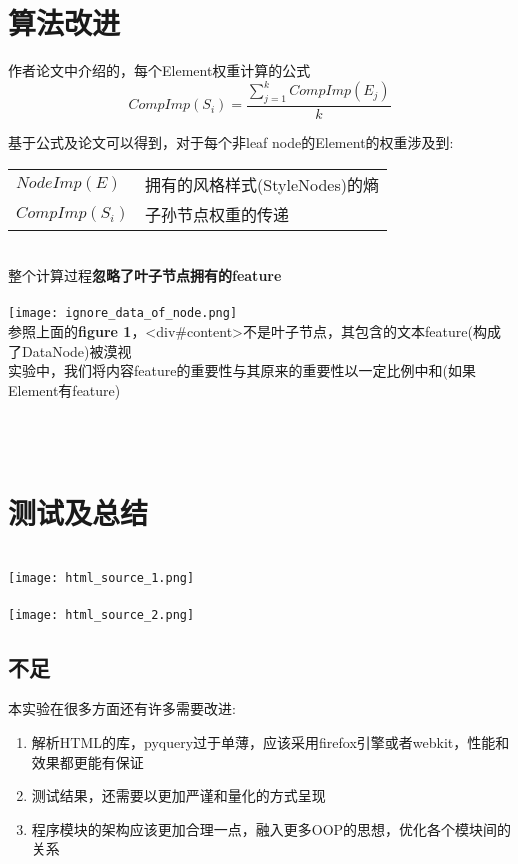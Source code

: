\documentclass[a4paper]{ctexart}
\begin{document}
\section{算法改进}
\par 作者论文中介绍的，每个Element权重计算的公式
{
$$
CompImp(S_i) = \frac{
        \sum_{j=1}^{k}{CompImp(E_j)}
    } {k}
$$}
\par 基于公式及论文可以得到，对于每个非leaf node的Element的权重涉及到:\\
\begin{tabular}[t]{ll}
    $NodeImp(E)$ &  拥有的风格样式(StyleNodes)的熵\\
    $CompImp(S_i)$ & 子孙节点权重的传递\\
\end{tabular}
\\
整个计算过程\textbf{\color{red}忽略了叶子节点拥有的feature}\\
\\
\texttt{[image: ignore\_data\_of\_node.png]}\\
参照上面的\textbf{figure 1}，<div\#content>不是叶子节点，其包含的文本feature(构成了DataNode)被漠视\\
实验中，我们将内容feature的重要性与其原来的重要性以一定比例中和(如果Element有feature)
{}

\\
\\
\section{测试及总结}
\begin{center}
    \\
    \texttt{[image: html\_source\_1.png]}\\
    \\
    \texttt{[image: html\_source\_2.png]}
\end{center}
\subsection{不足}
本实验在很多方面还有许多需要改进:
\begin{enumerate}
    \item 解析HTML的库，pyquery过于单薄，应该采用firefox引擎或者webkit，性能和效果都更能有保证 
    \item 测试结果，还需要以更加严谨和量化的方式呈现
    \item 程序模块的架构应该更加合理一点，融入更多OOP的思想，优化各个模块间的关系
\end{enumerate}
\end{document}
